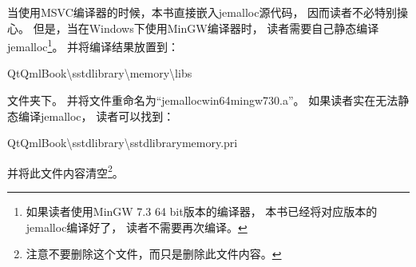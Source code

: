 当使用MSVC编译器的时候，本书直接嵌入jemalloc源代码，
因而读者不必特别操心。
但是，当在Windows下使用MinGW编译器时，
读者需要自己静态编译jemalloc\footnote{
如果读者使用MinGW 7.3 64 bit版本的编译器，
本书已经将对应版本的jemalloc编译好了，
读者不需要再次编译。
}。
并将编译结果放置到：
\begin{littlelongworld}
QtQmlBook\textbackslash{}sstd\underline{\hspace{0.5em}}library\textbackslash{}memory\textbackslash{}libs
\end{littlelongworld}
文件夹下。
并将文件重命名为“jemalloc\underline{\hspace{0.5em}}win64\underline{\hspace{0.5em}}mingw\underline{\hspace{0.5em}}730.a”。
如果读者实在无法静态编译jemalloc，
读者可以找到：
\begin{littlelongworld}
QtQmlBook\textbackslash{}sstd\underline{\hspace{0.5em}}library\textbackslash{}\underline{\hspace{0.5em}}sstd\underline{\hspace{0.5em}}library\underline{\hspace{0.5em}}memory.pri
\end{littlelongworld}
并将此文件内容清空\footnote{
注意不要删除这个文件，而只是删除此文件内容。
}。












